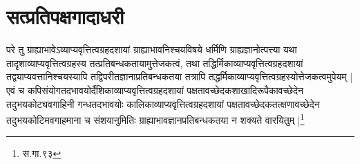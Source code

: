 \section{सत्प्रतिपक्षगादाधरी}
परे तु ग्राह्याभावेऽव्याप्यवृत्तित्वग्रहदशायां ग्राह्याभावनिश्चयविषये धर्मिणि ग्राह्यज्ञानोत्पत्त्या यथा तादृशाव्याप्यवृत्तित्वग्रहस्य तत्प्रतिबन्धकतायामुत्तेजकत्वं, तथा तद्धिर्मिकाव्याप्यवृत्तित्वग्रहदशायां तद्व्याप्यवत्तानिश्चयस्यापि तद्विपरीतज्ञानाप्रतिबन्धकतया तत्रापि तद्धर्मिकाव्याप्यवृत्तित्वग्रहस्योत्तेजकत्वमुपेयम् | एवं च कपिसंयोगतदभावयोर्दैशिकाव्याप्यवृत्तित्वग्रहदशायां पक्षतावच्छेदकशाखादिरूपैकावच्छेदेन तदुभयकोट्यवगाहिनी गन्धतदभावयोः कालिकाव्याप्यवृत्तित्वग्रहदशायां पक्षतावच्छेदकतत्क्षणावच्छेदेन तदुभयकोटिमवगाहमाना च संशयानुमितिः ग्राह्याभावज्ञानप्रतिबन्धकतया न शक्यते वारयितुम् |\footnote{स.गा.९३}
